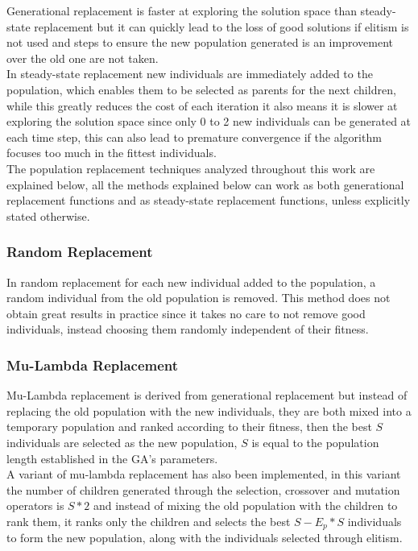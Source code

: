 Generational replacement is faster at exploring the solution space than steady-state replacement but it can quickly lead to the loss of good solutions if elitism is not used and steps to ensure the new population generated is an improvement over the old one are not taken.
\\In steady-state replacement new individuals are immediately added to the population, which enables them to be selected as parents for the next children, while this greatly reduces the cost of each iteration it also means it is slower at exploring the solution space since only 0 to 2 new individuals can be generated at each time step, this can also lead to premature convergence if the algorithm focuses too much in the fittest individuals.  
\\The population replacement techniques analyzed throughout this work are explained below, all the methods explained below can work as both generational replacement functions and as steady-state replacement functions, unless explicitly stated otherwise.

	\subsubsection{Random Replacement}

	In random replacement for each new individual added to the population, a random individual from the old population is removed. This method does not obtain great results in practice since it takes no care to not remove good individuals, instead choosing them randomly independent of their fitness.

	\subsubsection{Mu-Lambda Replacement}

	Mu-Lambda replacement \parencite{Jyotishree2012a} is derived from generational replacement but instead of replacing the old population with the new individuals, they are both mixed into a temporary population and ranked according to their fitness, then the best $S$ individuals are selected as the new population, $S$ is equal to the population length established in the GA's parameters.
	\\A variant of mu-lambda replacement has also been implemented, in this variant the number of children generated through the selection, crossover and mutation operators is $S*2$ and instead of mixing the old population with the children to rank them, it ranks only the children and selects the best $S-E_p*S$ individuals to form the new population, along with the individuals selected through elitism. 

